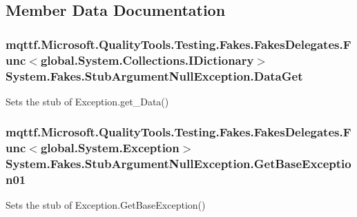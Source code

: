 \subsection{Member Data Documentation}
\hypertarget{class_system_1_1_fakes_1_1_stub_argument_null_exception_a759a76bae7d83fea6f9841c5178b24a1}{
\subsubsection[{Data\-Get}]{\setlength{\rightskip}{0pt plus 5cm}mqttf.\-Microsoft.\-Quality\-Tools.\-Testing.\-Fakes.\-Fakes\-Delegates.\-Func$<$global.\-System.\-Collections.\-I\-Dictionary$>$ System.\-Fakes.\-Stub\-Argument\-Null\-Exception.\-Data\-Get}}\label{class_system_1_1_fakes_1_1_stub_argument_null_exception_a759a76bae7d83fea6f9841c5178b24a1}


Sets the stub of Exception.\-get\-\_\-\-Data()

\hypertarget{class_system_1_1_fakes_1_1_stub_argument_null_exception_ae706167a6c175b8ca04403d2a137f462}{
\subsubsection[{Get\-Base\-Exception01}]{\setlength{\rightskip}{0pt plus 5cm}mqttf.\-Microsoft.\-Quality\-Tools.\-Testing.\-Fakes.\-Fakes\-Delegates.\-Func$<$global.\-System.\-Exception$>$ System.\-Fakes.\-Stub\-Argument\-Null\-Exception.\-Get\-Base\-Exception01}}\label{class_system_1_1_fakes_1_1_stub_argument_null_exception_ae706167a6c175b8ca04403d2a137f462}


Sets the stub of Exception.\-Get\-Base\-Exception()

